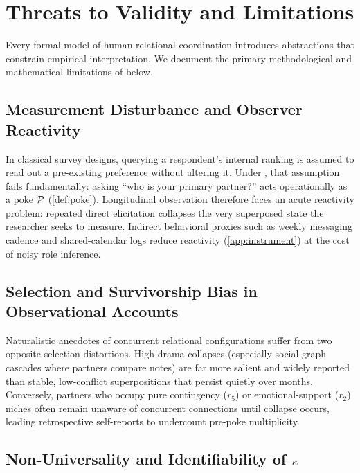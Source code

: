 \section{Threats to Validity and Limitations}
\label{sec:limitations}

Every formal model of human relational coordination introduces abstractions
that constrain empirical interpretation. We document the primary methodological
and mathematical limitations of \RST{} below.

\subsection{Measurement Disturbance and Observer Reactivity}
\label{subsec:lim-measurement}

In classical survey designs, querying a respondent's internal ranking is
assumed to read out a pre-existing preference without altering it. Under \RST{},
that assumption fails fundamentally: asking ``who is your primary partner?''
acts operationally as a poke $\mathcal{P}$ (\cref{def:poke}). Longitudinal observation
therefore faces an acute reactivity problem: repeated direct elicitation
collapses the very superposed state the researcher seeks to measure. Indirect
behavioral proxies such as weekly messaging cadence and shared-calendar logs
reduce reactivity (\cref{app:instrument}) at the cost of noisy role inference.

\subsection{Selection and Survivorship Bias in Observational Accounts}
\label{subsec:lim-selection}

Naturalistic anecdotes of concurrent relational configurations suffer from two
opposite selection distortions. High-drama collapses (especially social-graph
cascades where partners compare notes) are far more salient and widely reported
than stable, low-conflict superpositions that persist quietly over months.
Conversely, partners who occupy pure contingency ($r_5$) or emotional-support
($r_2$) niches often remain unaware of concurrent connections until collapse
occurs, leading retrospective self-reports to undercount pre-poke multiplicity.

\subsection{Non-Universality and Identifiability of \texorpdfstring{$\kappa$}{kappa}}
\label{subsec:lim-kappa}

